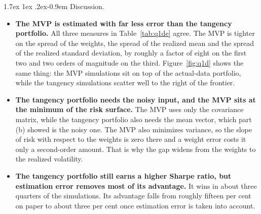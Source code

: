 \documentclass[11pt]{article}
\makeatletter
\renewcommand\paragraph{\@startsection{paragraph}{4}{0pt}%
  {1.7ex \@plus 1ex \@minus .2ex}{-0.9em}%
  {\normalfont\bfseries\normalsize\color{psink}}}
\makeatother
\begin{document}
\paragraph{Discussion.}
\begin{itemize}
\setlength{\itemsep}{4pt}\setlength{\parskip}{0pt}

\item \textbf{The MVP is estimated with far less error than the tangency
portfolio.} All three measures in Table~\ref{tab:q1de} agree. The MVP is
tighter on the spread of the weights, the spread of the realized mean and the
spread of the realized standard deviation, by roughly a factor of eight on the
first two and two orders of magnitude on the third. Figure~\ref{fig:q1d} shows
the same thing: the MVP simulations sit on top of the actual-data portfolio,
while the tangency simulations scatter well to the right of the frontier.

\item \textbf{The tangency portfolio needs the noisy input, and the MVP sits
at the minimum of the risk surface.} The MVP uses only the covariance matrix,
while the tangency portfolio also needs the mean vector, which part (b) showed
is the noisy one. The MVP also minimizes variance, so the slope of risk with
respect to the weights is zero there and a weight error costs it only a
second-order amount. That is why the gap widens from the weights to the
realized volatility.

\item \textbf{The tangency portfolio still earns a higher Sharpe ratio, but
estimation error removes most of its advantage.} It wins in about three
quarters of the simulations. Its advantage falls from roughly fifteen per cent
on paper to about three per cent once estimation error is taken into account.

\end{itemize}
\end{document}
